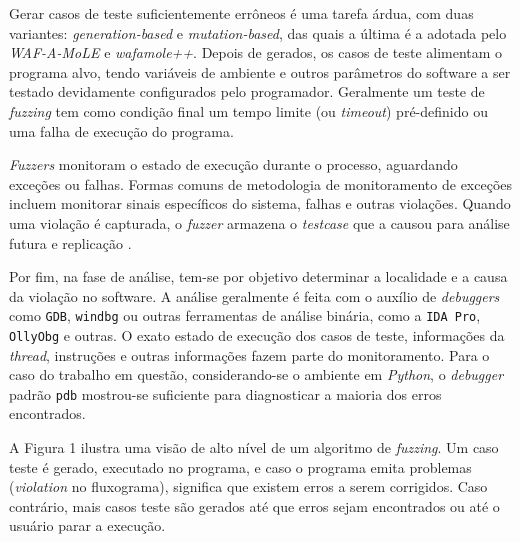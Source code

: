 Gerar casos de teste suficientemente errôneos é uma tarefa árdua, com duas variantes: \textit{generation-based} e \textit{mutation-based}, das quais a última é a adotada pelo \textit{WAF-A-MoLE} e \textit{wafamole++}. Depois de gerados, os casos de teste alimentam o programa alvo, tendo variáveis de ambiente e outros parâmetros do software a ser testado devidamente configurados pelo programador. Geralmente um teste de \textit{fuzzing} tem como condição final um tempo limite (ou \textit{timeout}) pré-definido ou uma falha de execução do programa.

\textit{Fuzzers} monitoram o estado de execução durante o processo, aguardando exceções ou falhas.  Formas comuns de metodologia de monitoramento de exceções incluem monitorar sinais específicos do sistema, falhas e outras violações. Quando uma violação é capturada, o \textit{fuzzer} armazena o \textit{testcase} que a causou para análise futura e replicação \cite{li2018fuzzing}.

Por fim, na fase de análise, tem-se por objetivo determinar a localidade e a causa da violação no software. A análise geralmente é feita com o auxílio de \textit{debuggers} como \verb+GDB+, \verb+windbg+ ou outras ferramentas de análise binária, como a \verb+IDA Pro+, \verb+OllyObg+ e outras. O exato estado de execução dos casos de teste, informações da \textit{thread}, instruções e outras informações fazem parte do monitoramento. Para o caso do trabalho em questão, considerando-se o ambiente em \textit{Python}, o \textit{debugger} padrão \verb+pdb+ mostrou-se suficiente para diagnosticar a maioria dos erros encontrados. 

A Figura 1 ilustra uma visão de alto nível de um algoritmo de \textit{fuzzing}. Um caso teste é gerado, executado no programa, e caso o programa emita problemas (\textit{violation} no fluxograma), significa que existem erros a serem corrigidos. Caso contrário, mais casos teste são gerados até que erros sejam encontrados ou até o usuário parar a execução.

